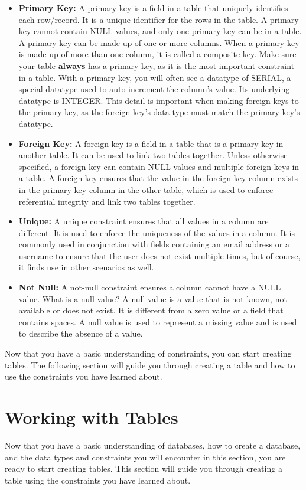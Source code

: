 \begin{itemize}
    \item \textbf{Primary Key:} A primary key is a field in a table that uniquely identifies each row/record. It is a unique identifier for the rows in the table. A primary key cannot contain NULL values, and only one primary key can be in a table. A primary key can be made up of one or more columns. When a primary key is made up of more than one column, it is called a composite key. Make sure your table \textbf{always} has a primary key, as it is the most important constraint in a table. With a primary key, you will often see a datatype of SERIAL, a special datatype used to auto-increment the column's value. Its underlying datatype is INTEGER. This detail is important when making foreign keys to the primary key, as the foreign key's data type must match the primary key's datatype.
    \item \textbf{Foreign Key:} A foreign key is a field in a table that is a primary key in another table. It can be used to link two tables together. Unless otherwise specified, a foreign key can contain NULL values and multiple foreign keys in a table. A foreign key ensures that the value in the foreign key column exists in the primary key column in the other table, which is used to enforce referential integrity and link two tables together.
    \item \textbf{Unique:} A unique constraint ensures that all values in a column are different. It is used to enforce the uniqueness of the values in a column. It is commonly used in conjunction with fields containing an email address or a username to ensure that the user does not exist multiple times, but of course, it finds use in other scenarios as well.
    \item \textbf{Not Null:} A not-null constraint ensures a column cannot have a NULL value. What is a null value? A null value is a value that is not known, not available or does not exist. It is different from a zero value or a field that contains spaces. A null value is used to represent a missing value and is used to describe the absence of a value.
\end{itemize}

Now that you have a basic understanding of constraints, you can start creating tables. The following section will guide you through creating a table and how to use the constraints you have learned about.

\section{Working with Tables}
Now that you have a basic understanding of databases, how to create a database, and the data types and constraints you will encounter in this section, you are ready to start creating tables. This section will guide you through creating a table using the constraints you have learned about.

